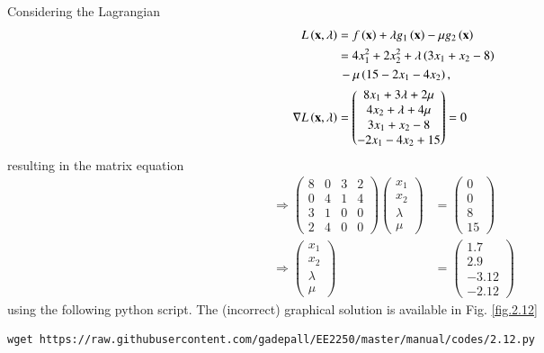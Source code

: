 \documentclass[journal,12pt,twocolumn]{IEEEtran}
\begin{document}
%
\solution Considering the Lagrangian
%
\begin{align}
L\left(\mathbf{x},\lambda\right) &= f\left(\mathbf{x}\right) + \lambda g_1\left(\mathbf{x}\right) - \mu g_2\left(\mathbf{x}\right) \\
 &= 4x_1^2 + 2x_2^2 + \lambda \left(3x_1 + x_2-8\right) 
 \nonumber \\
 &\,-\mu\left(15 - 2x_1 - 4x_2\right),\\
 \nabla L\left(\mathbf{x},\lambda\right)  & = 
\begin{pmatrix}
8x_1 + 3 \lambda  +2 \mu  \\
4x_2 + \lambda + 4 \mu \\
3x_1 + x_2 -8 \\
 - 2x_1 - 4x_2 + 15
\end{pmatrix}
= 0
\end{align}
%
resulting in the matrix equation
%
\begin{align}
\Rightarrow 
\begin{pmatrix}
8 &0 & 3 & 2\\
0 &4 & 1 & 4 \\
3 & 1 & 0 &0  \\
2 & 4 & 0 & 0
\end{pmatrix}
\begin{pmatrix}
x_1 \\
x_2 \\
\lambda
\\
\mu
\end{pmatrix}
&=
\begin{pmatrix}
0 \\
0 \\
8 \\
15
\end{pmatrix}
\\
\Rightarrow 
\begin{pmatrix}
x_1 \\
x_2 \\
\lambda
\\
\mu
\end{pmatrix}
&= 
\begin{pmatrix}
1.7 \\
 2.9 \\
-3.12 \\
-2.12
\end{pmatrix}
\end{align}
%
using the following python script.  The (incorrect) graphical solution is available in Fig. \ref{fig.2.12}
%	
\begin{lstlisting}
wget https://raw.githubusercontent.com/gadepall/EE2250/master/manual/codes/2.12.py
\end{lstlisting}
\end{document}
